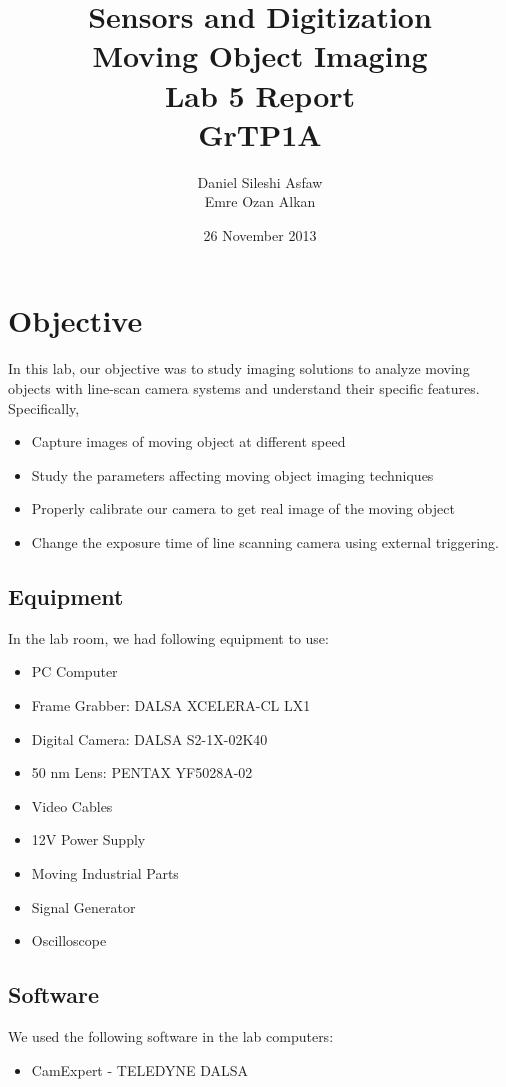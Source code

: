 \documentclass{article}
\title{Sensors and Digitization\\
		Moving Object Imaging\\
		Lab 5 Report\\
		GrTP1A}
\author{Daniel Sileshi Asfaw\\
		Emre Ozan Alkan\\}
\date{26 November 2013}
\begin{document}
\maketitle

\section{Objective}
	In this lab, our objective was to study imaging solutions to analyze moving objects with line-scan camera systems and understand their specific features. Specifically,
	\begin{itemize}
		\item Capture images of moving object at different speed
		\item Study the parameters affecting moving object imaging techniques
		\item Properly calibrate our camera to get real image of the moving object
		\item Change the exposure time of line scanning camera using external triggering.
	\end{itemize}

	\subsection{Equipment}
	In the lab room, we had following equipment to use:
	\begin{itemize}
		\item PC Computer
		\item Frame Grabber: DALSA XCELERA-CL LX1
		\item Digital Camera: DALSA S2-1X-02K40
		\item 50 nm Lens: PENTAX YF5028A-02
		\item Video Cables
		\item 12V Power Supply
		\item Moving Industrial Parts
		\item Signal Generator
		\item Oscilloscope
	\end{itemize}		
	
	\subsection{Software}
	We used the following software in the lab computers:
	\begin{itemize}
		\item CamExpert - TELEDYNE DALSA
	\end{itemize}
	
\end{document}
